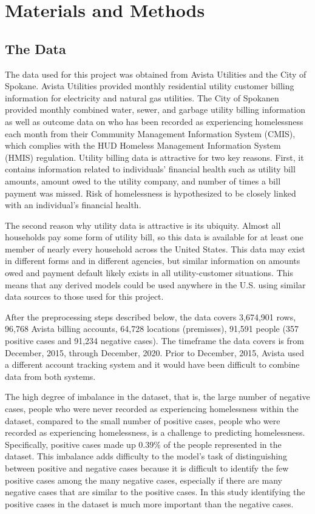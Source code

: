 \documentclass[10pt,letterpaper]{article}
\newcommand{\red}[1]{{\color{red}{#1}}}
\begin{document}
\section*{Materials and Methods}
\subsection*{The Data}
The data used for this project was obtained from Avista Utilities and the City of Spokane. Avista Utilities provided monthly residential utility customer billing information for electricity and natural gas utilities. The City of Spokanen provided monthly combined water, sewer, and garbage utility billing information as well as outcome data on who has been recorded as experiencing homelessness each month from their Community Management Information System (CMIS), which complies with the HUD Homeless Management Information System (HMIS) regulation. Utility billing data is attractive for two key reasons. First, it contains information related to individuals' financial health such as utility bill amounts, amount owed to the utility company, and number of times a bill payment was missed. Risk of homelessness is hypothesized to be closely linked with an individual's financial health.

The second reason why utility data is attractive is its ubiquity. Almost all households pay some form of utility bill, so this data is available for at least one member of nearly every household across the United States. This data may exist in different forms and in different agencies, but similar information on amounts owed and payment default likely exists in all utility-customer situations. This means that any derived models could be used anywhere in the U.S. using similar data sources to those used for this project.

After the preprocessing steps described below, the data covers 3,674,901 rows, 96,768 Avista billing accounts, 64,728 locations (premisses), 91,591 people (357 positive cases and 91,234 negative cases). The timeframe the data covers is from December, 2015, through December, 2020. Prior to December, 2015, Avista used a different account tracking system and it would have been difficult to combine data from both systems. \red{ADD proportion of Spokane population}

The high degree of imbalance in the dataset, that is, the large number of negative cases, people who were never recorded as experiencing homelessness within the dataset, compared to the small number of positive cases, people who were recorded as experiencing homelessness, is a challenge to predicting homelessness. Specifically, positive cases made up 0.39\% of the people represented in the dataset. This imbalance adds difficulty to the model's task of distinguishing between positive and negative cases because it is difficult to identify the few positive cases among the many negative cases, especially if there are many negative cases that are similar to the positive cases. In this study identifying the positive cases in the dataset is much more important than the negative cases.
\end{document}
